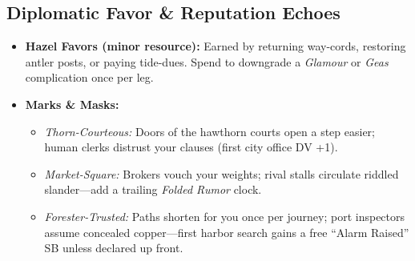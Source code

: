 \subsection*{Diplomatic Favor \& Reputation Echoes}
\begin{itemize}
  \item \textbf{Hazel Favors (minor resource):} Earned by returning way-cords, restoring antler posts, or paying tide-dues. Spend to downgrade a \emph{Glamour} or \emph{Geas} complication once per leg.
  \item \textbf{Marks \& Masks:}
    \begin{itemize}
      \item \emph{Thorn-Courteous:} Doors of the hawthorn courts open a step easier; human clerks distrust your clauses (first city office DV +1).
      \item \emph{Market-Square:} Brokers vouch your weights; rival stalls circulate riddled slander—add a trailing \emph{Folded Rumor} clock.
      \item \emph{Forester-Trusted:} Paths shorten for you once per journey; port inspectors assume concealed copper—first harbor search gains a free “Alarm Raised” SB unless declared up front.
    \end{itemize}
\end{itemize}